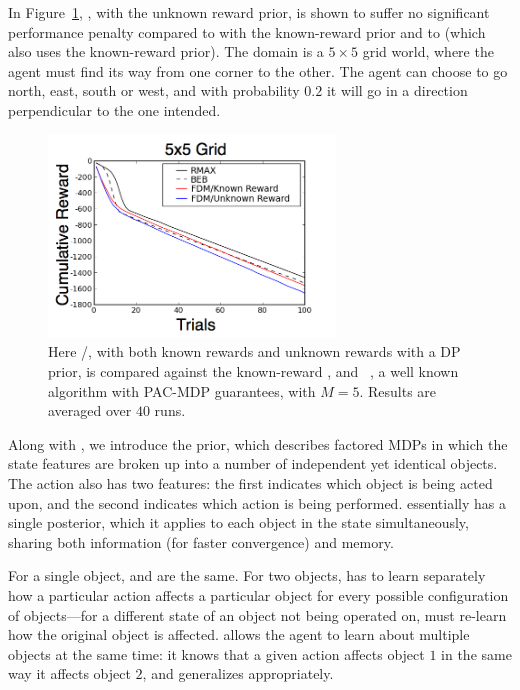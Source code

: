In Figure~\ref{fig:grids}, , with the unknown reward prior, is shown to suffer no significant performance penalty compared to  with the known-reward prior and to  (which also uses the known-reward prior). The domain is a $5\times 5$ grid world, where the agent must find its way from one corner to the other. The agent can choose to go north, east, south or west, and with probability $0.2$ it will go in a direction perpendicular to the one intended.



\begin{figure}
\vskip 0.2in
\begin{center}
\centerline{\includegraphics[width=3in]{figures/grids}}
\caption{
Here /, with both known rewards and unknown rewards with a DP prior, is compared against the known-reward , and ~\cite{brafman02}, a well known algorithm with PAC-MDP guarantees, with $M=5$. Results are averaged over $40$ runs.
}
\label{fig:grids}
\end{center}
\vskip -0.2in
\end{figure} 

Along with , we introduce the  prior, which describes factored MDPs in which the state features are broken up into a number of independent yet identical objects. The action also has two features: the first indicates which object is being acted upon, and the second indicates which action is being performed.  essentially has a single  posterior, which it applies to each object in the state simultaneously, sharing both information (for faster convergence) and memory.


For a single object,  and  are the same. For two objects,  has to learn separately how a particular action affects a particular object for every possible configuration of objects---for a different state of an object not being operated on,  must re-learn how the original object is affected.  allows the agent to learn about multiple objects at the same time: it knows that a given action affects object $1$ in the same way it affects object $2$, and generalizes appropriately.

